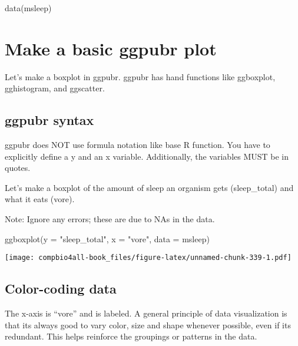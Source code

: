\documentclass[
]{book}
\newenvironment{Shaded}{\begin{snugshade}}{\end{snugshade}}
\newcommand{\AttributeTok}[1]{\textcolor[rgb]{0.77,0.63,0.00}{#1}}
\newcommand{\FunctionTok}[1]{\textcolor[rgb]{0.00,0.00,0.00}{#1}}
\newcommand{\NormalTok}[1]{#1}
\newcommand{\StringTok}[1]{\textcolor[rgb]{0.31,0.60,0.02}{#1}}
\begin{document}
\begin{Shaded}
\begin{Highlighting}[]
\FunctionTok{data}\NormalTok{(msleep)}
\end{Highlighting}
\end{Shaded}

\hypertarget{make-a-basic-ggpubr-plot}{%
\section{Make a basic ggpubr plot}\label{make-a-basic-ggpubr-plot}}

Let's make a boxplot in ggpubr. ggpubr has hand functions like ggboxplot, gghistogram, and ggscatter.

\hypertarget{ggpubr-syntax}{%
\subsection{ggpubr syntax}\label{ggpubr-syntax}}

ggpubr does NOT use formula notation like base R function. You have to explicitly define a y and an x variable. Additionally, the variables MUST be in quotes.

Let's make a boxplot of the amount of sleep an organism gets (sleep\_total) and what it eats (vore).

Note: Ignore any errors; these are due to NAs in the data.

\begin{Shaded}
\begin{Highlighting}[]
\FunctionTok{ggboxplot}\NormalTok{(}\AttributeTok{y =} \StringTok{"sleep\_total"}\NormalTok{,}
          \AttributeTok{x =} \StringTok{"vore"}\NormalTok{,}
          \AttributeTok{data =}\NormalTok{ msleep)}
\end{Highlighting}
\end{Shaded}

\texttt{[image: compbio4all-book\_files/figure-latex/unnamed-chunk-339-1.pdf]}

\hypertarget{color-coding-data}{%
\subsection{Color-coding data}\label{color-coding-data}}

The x-axis is ``vore'' and is labeled. A general principle of data visualization is that its always good to vary color, size and shape whenever possible, even if its redundant. This helps reinforce the groupings or patterns in the data.
\end{document}
